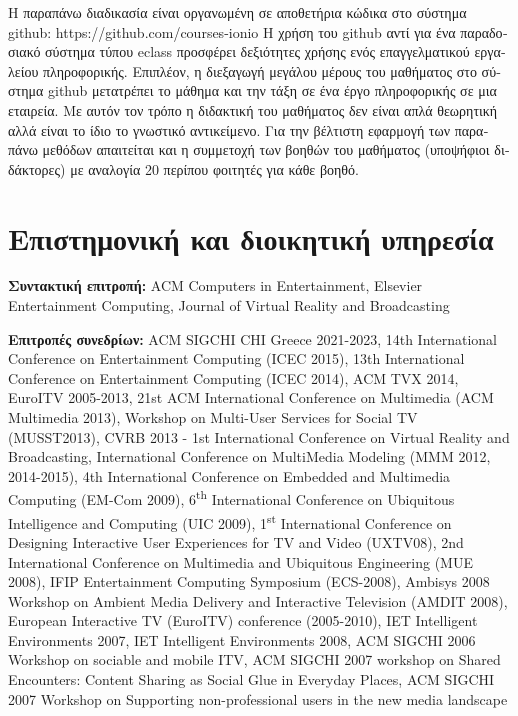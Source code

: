 \documentclass[11pt, a4paper]{article}
\begin{document}
\begin{greek}
Η παραπάνω διαδικασία είναι οργανωμένη σε αποθετήρια κώδικα στο σύστημα
github: https://github.com/courses-ionio Η χρήση του github αντί για ένα
παραδοσιακό σύστημα τύπου eclass προσφέρει δεξιότητες χρήσης ενός
επαγγελματικού εργαλείου πληροφορικής. Επιπλέον, η διεξαγωγή μεγάλου
μέρους του μαθήματος στο σύστημα github μετατρέπει το μάθημα και την
τάξη σε ένα έργο πληροφορικής σε μια εταιρεία. Με αυτόν τον τρόπο η
διδακτική του μαθήματος δεν είναι απλά θεωρητική αλλά είναι το ίδιο το
γνωστικό αντικείμενο. Για την βέλτιστη εφαρμογή των παραπάνω μεθόδων
απαιτείται και η συμμετοχή των βοηθών του μαθήματος (υποψήφιοι
διδάκτορες) με αναλογία 20 περίπου φοιτητές για κάθε βοηθό.

\hypertarget{ux3b5ux3c0ux3b9ux3c3ux3c4ux3b7ux3bcux3bfux3bdux3b9ux3baux3ae-ux3baux3b1ux3b9-ux3b4ux3b9ux3bfux3b9ux3baux3b7ux3c4ux3b9ux3baux3ae-ux3c5ux3c0ux3b7ux3c1ux3b5ux3c3ux3afux3b1}{%
\section{Επιστημονική και διοικητική
υπηρεσία}\label{ux3b5ux3c0ux3b9ux3c3ux3c4ux3b7ux3bcux3bfux3bdux3b9ux3baux3ae-ux3baux3b1ux3b9-ux3b4ux3b9ux3bfux3b9ux3baux3b7ux3c4ux3b9ux3baux3ae-ux3c5ux3c0ux3b7ux3c1ux3b5ux3c3ux3afux3b1}}

\textbf{Συντακτική επιτροπή:} ACM Computers in Entertainment, Elsevier
Entertainment Computing, Journal of Virtual Reality and Broadcasting

\textbf{Επιτροπές συνεδρίων:} ACM SIGCHI CHI Greece 2021-2023, 14th
International Conference on Entertainment Computing (ICEC 2015), 13th
International Conference on Entertainment Computing (ICEC 2014), ACM TVX
2014, EuroITV 2005-2013, 21st ACM International Conference on Multimedia
(ACM Multimedia 2013), Workshop on Multi-User Services for Social TV
(MUSST2013), CVRB 2013 - 1st International Conference on Virtual Reality
and Broadcasting, International Conference on MultiMedia Modeling (MMM
2012, 2014-2015), 4th International Conference on Embedded and
Multimedia Computing (EM-Com 2009), 6\textsuperscript{th} International
Conference on Ubiquitous Intelligence and Computing (UIC 2009),
1\textsuperscript{st} International Conference on Designing Interactive
User Experiences for TV and Video (UXTV08), 2nd International Conference
on Multimedia and Ubiquitous Engineering (MUE 2008), IFIP Entertainment
Computing Symposium (ECS-2008), Ambisys 2008 Workshop on Ambient Media
Delivery and Interactive Television (AMDIT 2008), European Interactive
TV (EuroITV) conference (2005-2010), IET Intelligent Environments 2007,
IET Intelligent Environments 2008, ACM SIGCHI 2006 Workshop on sociable
and mobile ITV, ACM SIGCHI 2007 workshop on Shared Encounters: Content
Sharing as Social Glue in Everyday Places, ACM SIGCHI 2007 Workshop on
Supporting non-professional users in the new media landscape


\end{greek}
\end{document}
